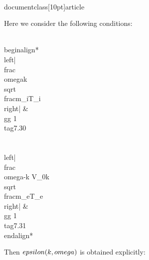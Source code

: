 \\documentclass[10pt]{article}
\begin{document}
{{{{Here we consider the following conditions:


\\begin{align*}
\\left|\\frac{\\omega}{k} \\sqrt{\\frac{m_{i}}{T_{i}}}\\right| & \\gg 1  \\tag{7.30}\\\\
\\left|\\frac{\\omega-k V_{0}}{k} \\sqrt{\\frac{m_{e}}{T_{e}}}\\right| & \\gg 1 \\tag{7.31}
\\end{align*}


Then $\\epsilon(k, \\omega)$ is obtained explicitly:


}}}}
\end{document}
